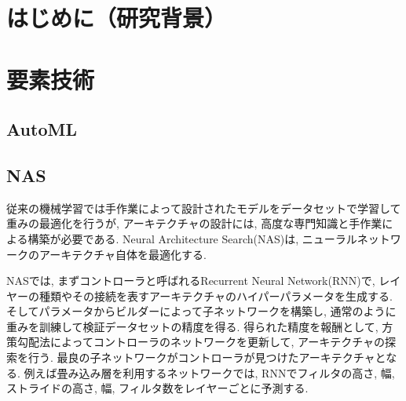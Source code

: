 \documentclass[twocolumn]{jarticle}     %
\begin{document}




\section{はじめに（研究背景）}

\section{要素技術}
\subsection{AutoML}
\subsection{NAS}
従来の機械学習では手作業によって設計されたモデルをデータセットで学習して重みの最適化を行うが, アーキテクチャの設計には, 高度な専門知識と手作業による構築が必要である.
Neural Architecture Search(NAS)\cite{DBLP:journals/corr/ZophL16}は, ニューラルネットワークのアーキテクチャ自体を最適化する.

NASでは, まずコントローラと呼ばれるRecurrent Neural Network(RNN)で, レイヤーの種類やその接続を表すアーキテクチャのハイパーパラメータを生成する. そしてパラメータからビルダーによって子ネットワークを構築し, 通常のように重みを訓練して検証データセットの精度を得る. 得られた精度を報酬として, 方策勾配法によってコントローラのネットワークを更新して, アーキテクチャの探索を行う. 最良の子ネットワークがコントローラが見つけたアーキテクチャとなる.
例えば畳み込み層を利用するネットワークでは, RNNでフィルタの高さ, 幅, ストライドの高さ, 幅, フィルタ数をレイヤーごとに予測する.
\end{document}
